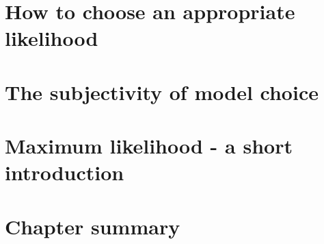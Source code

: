 \documentclass[11pt,fullpage]{book}
\begin{document}
\section{How to choose an appropriate likelihood}
\section{The subjectivity of model choice}
\section{Maximum likelihood - a short introduction}
\section{Chapter summary}
\end{document}
